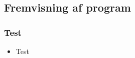 \subsection{Fremvisning af program}
\begin{frame}
  \frametitle{Test}
  \begin{itemize}
    \item Test
  \end{itemize}
\end{frame}
